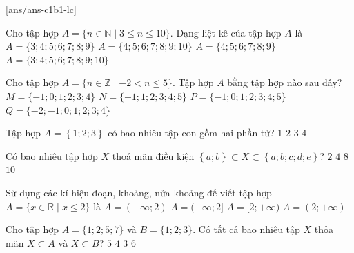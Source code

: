 \baitaptn
\TN
\setcounter{ex}{0}
[ans/ans-c1b1-lc]
\begin{ex}%
	Cho tập hợp $A = \{n \in \mathbb{N} \mid 3 \le n \le 10\}$. Dạng liệt kê của tập hợp $A$ là
	\choice
	{$A = \{3;4;5;6;7;8;9\}$}
	{$A = \{4;5;6;7;8;9;10\}$}
	{$A = \{4;5;6;7;8;9\}$}
	{\True $A = \{3;4;5;6;7;8;9;10\}$}
\end{ex}
\begin{ex}%
	Cho tập hợp $A = \{n \in \mathbb{Z} \mid -2 < n \le 5\}$. Tập hợp $A$ bằng tập hợp nào sau đây?
	\choice
	{$M = \{-1; 0; 1;2;3;4 \}$}
	{$N = \{-1; 1;2;3;4; 5 \}$}
	{\True $P = \{-1;0;1;2;3;4;5 \}$}
	{$Q = \{-2;-1; 0; 1;2;3;4 \}$}
\end{ex}
\begin{ex}%
	Tập hợp $A = \left\{1;2;3\right\}$ có bao nhiêu tập con gồm hai phần tử?
	\choice
	{$1$}
	{$2$}
	{\True $3$}
	{$4$}
\end{ex}
\begin{ex}%
	Có bao nhiêu tập hợp $X$ thoả mãn điều kiện $\left\{a; b\right\}\subset X \subset \left\{a;b;c;d;e\right\}$?
	\choice
	{$2$}
	{$4$}
	{\True $8$}
	{$10$}
\end{ex}
\begin{ex}%
	Sử dụng các kí hiệu đoạn, khoảng, nửa khoảng đế viết tập hợp $A=\{x \in \mathbb{R} \mid x \leq 2\}$ là
	\choice
	{$A=(-\infty; 2)$}
	{\True $A=(-\infty; 2]$}
	{$A=[2;+\infty)$}
	{$A=(2;+\infty)$}
\loigiai{
	Ta có $A=(-\infty; 2]$.
	}
\end{ex}
\begin{ex}%
	Cho tập hợp $A=\{1; 2; 5; 7\}$ và $B=\{1; 2; 3\}$. Có tất cả bao nhiêu tập $X$ thỏa mãn $X\subset A$ và $X\subset B$?
	\choice
	{$5$}
	{\True $4$}
	{$3$}
	{$6$}
\end{ex}
